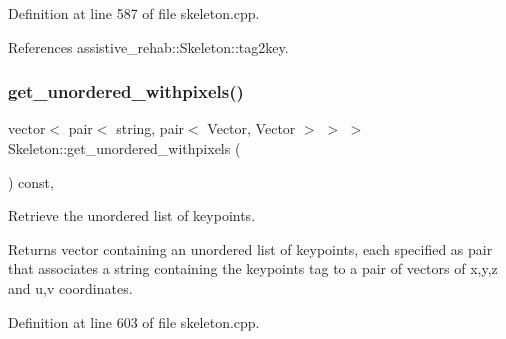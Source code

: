 Definition at line 587 of file skeleton.\+cpp.


\begin{DoxyCode}{0}

\end{DoxyCode}


References assistive\+\_\+rehab\+::\+Skeleton\+::tag2key.

\mbox{\label{classassistive__rehab_1_1Skeleton_a513a3dc56d55a7b10b256378ae63c6c7}} 
\subsubsection{\texorpdfstring{get\_unordered\_withpixels()}{get\_unordered\_withpixels()}}
{\footnotesize\ttfamily vector$<$ pair$<$ string, pair$<$ Vector, Vector $>$ $>$ $>$ Skeleton\+::get\+\_\+unordered\+\_\+withpixels (\begin{DoxyParamCaption}{ }\end{DoxyParamCaption}) const\hspace{0.3cm}{\ttfamily [virtual]}, {\ttfamily [inherited]}}



Retrieve the unordered list of keypoints. 

\begin{DoxyReturn}{Returns}
vector containing an unordered list of keypoints, each specified as pair that associates a string containing the keypoint\textquotesingle{}s tag to a pair of vectors of x,y,z and u,v coordinates. 
\end{DoxyReturn}


Definition at line 603 of file skeleton.\+cpp.


\begin{DoxyCode}{0}

\end{DoxyCode}


